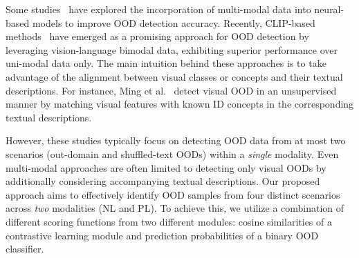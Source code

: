 Some studies~\cite{sun2020real, wang2021radar} have explored the incorporation of multi-modal data into neural-based models to improve OOD detection accuracy. Recently, CLIP-based methods~\cite{fort2021exploring, ming2022delving,esmaeilpour2022zero} have emerged as a promising approach for OOD detection by leveraging vision-language bimodal data, exhibiting superior performance over uni-modal data only. The main intuition behind these approaches is to take advantage of the alignment between visual classes or concepts and their textual descriptions. For instance, Ming et al.~\cite{ming2022delving} detect visual OOD in an unsupervised manner by matching visual features with known ID concepts in the corresponding textual descriptions. 

However, these studies typically focus on detecting OOD data from at most two scenarios (\ie out-domain and shuffled-text OODs) within a \textit{single} modality. Even multi-modal approaches are often limited to detecting only visual OODs by additionally considering accompanying textual descriptions. Our proposed approach aims to effectively identify OOD samples from four distinct scenarios across \textit{two} modalities (\ie NL and PL). To achieve this, we utilize a combination of different scoring functions from two different modules: cosine similarities of a contrastive learning module and prediction probabilities of a binary OOD classifier. %





